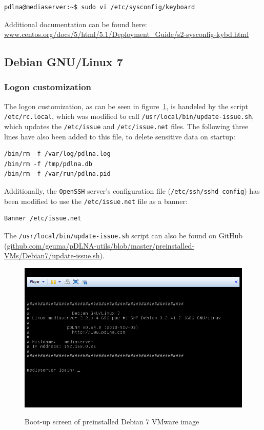 \documentclass[a4paper,oneside,10pt]{report}
\newenvironment{colframefile}{%
  \begin{Sbox}
    \begin{minipage}{.99\columnwidth}
}{%
  \end{minipage}
  \end{Sbox}
  \begin{center}
    \fcolorbox{black}{Yellow}{\TheSbox}
  \end{center}
}
\begin{document}
\begin{lstlisting}
pdlna@mediaserver:~$ sudo vi /etc/sysconfig/keyboard
\end{lstlisting}

Additional documentation can be found here: \url{www.centos.org/docs/5/html/5.1/Deployment_Guide/s2-sysconfig-kybd.html}

\subsection{Debian GNU/Linux 7}

\subsubsection{Logon customization}

The logon customization, as can be seen in figure~\ref{fig:debian7-loginscreen}, is handeled by the script \verb|/etc/rc.local|, which was modified to call \verb|/usr/local/bin/update-issue.sh|, which updates the \verb|/etc/issue| and \verb|/etc/issue.net| files. The following three lines have also been added to this file, to delete sensitive data on startup:
\begin{colframefile}
\begin{verbatim}
/bin/rm -f /var/log/pdlna.log
/bin/rm -f /tmp/pdlna.db
/bin/rm -f /var/run/pdlna.pid
\end{verbatim}
\end{colframefile}

Additionally, the \verb|OpenSSH| server's configuration file (\verb|/etc/ssh/sshd_config|) has been modified to use the \verb|/etc/issue.net| file as a banner:
\begin{colframefile}
\begin{verbatim}
Banner /etc/issue.net
\end{verbatim}
\end{colframefile}

The \verb|/usr/local/bin/update-issue.sh| script can also be found on GitHub (\url{github.com/geuma/pDLNA-utils/blob/master/preinstalled-VMs/Debian7/update-issue.sh}).

\begin{figure}
	\centering
		\includegraphics[width=34em]{images/vm_debian7_loginscreen}
	\label{fig:debian7-loginscreen}
	\caption{Boot-up screen of preinstalled Debian 7 VMware image}
\end{figure}
\end{document}
